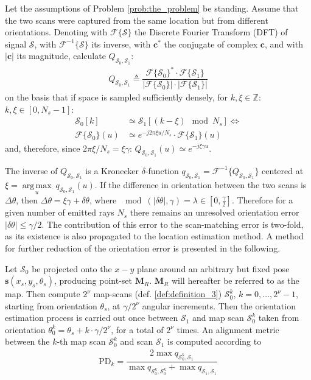 Let the assumptions of Problem \ref{prob:the_problem} be standing. Assume that
the two scans were captured from the same location but from different
orientations. Denoting with $\mathcal{F}\{\mathcal{S}\}$ the Discrete Fourier
Transform (DFT) of signal $\mathcal{S}$, with $\mathcal{F}^{-1}\{\mathcal{S}\}$
its inverse, with $\bm{c}^\ast$ the conjugate of complex $\bm{c}$, and with
$|\bm{c}|$ its magnitude, calculate
$Q_{\mathcal{S}_0, \mathcal{S}_1}$:
\begin{align}
  Q_{\mathcal{S}_0, \mathcal{S}_1} \triangleq \dfrac{\mathcal{F}\{\mathcal{S}_0\}^{\ast} \cdot \mathcal{F}\{\mathcal{S}_1\}}{|\mathcal{F}\{\mathcal{S}_0\}| \cdot |\mathcal{F}\{\mathcal{S}_1\}|}
  \label{eq:Q}
\end{align}
on the basis that if space is sampled sufficiently densely, for
$k,\xi \in \mathbb{Z}$: $k,\xi \in [0, N_s-1]$:
\begin{align}
  \mathcal{S}_0[k] &\simeq \mathcal{S}_1[(k - \xi) \mod N_s] \Leftrightarrow \nonumber \\
  \mathcal{F}\{\mathcal{S}_0\}(u) &\simeq e^{-j 2\pi \xi u / N_s} \cdot \mathcal{F}\{\mathcal{S}_1\}(u) \nonumber
\end{align}
and, therefore, since $2\pi \xi/N_s = \xi \gamma$: $Q_{\mathcal{S}_0, \mathcal{S}_1}(u)  \simeq e^{-j \xi \gamma u}$.

The inverse of $Q_{\mathcal{S}_0, \mathcal{S}_1}$ is a Kronecker
$\delta$-function
$q_{\mathcal{S}_0, \mathcal{S}_1} = \mathcal{F}^{-1}\{Q_{\mathcal{S}_0, \mathcal{S}_1}\}$
centered at $\xi = \operatorname*{arg\,max}\limits_u \ q_{\mathcal{S}_0, \mathcal{S}_1}(u)$.
If the difference in orientation between the two scans is $\Delta\theta$, then
$\Delta\theta = \xi\gamma + \delta\theta$, where
$\mod(|\delta\theta|, \gamma) = \lambda \in [0,\frac{\gamma}{2}]$. Therefore for
a given number of emitted rays $N_s$ there remains an unresolved orientation
error $|\delta\theta| \leq \gamma/2$. The contribution of this error to the
scan-matching error is two-fold, as its existence is also propagated to the
location estimation method. A method for further reduction of
the orientation error is presented in the following.

Let $\mathcal{S}_0$ be projected onto the $x-y$ plane around an arbitrary but
fixed pose $\bm{s}(x_s, y_s, \theta_s)$, producing point-set $\bm{M}_R$.
$\bm{M}_R$ will hereafter be referred to as the map. Then compute $2^\nu$
map-scans (def. \ref{def:definition_3}) $\mathcal{S}_0^k$,
$k = 0,\dots,2^\nu-1$, starting from orientation $\theta_s$, at $\gamma / 2^\nu$
angular increments. Then the orientation estimation process is carried out once
between $\mathcal{S}_1$ and map scan $\mathcal{S}_0^k$ taken from orientation
$\theta_0^k = \theta_s + k \cdot \gamma / 2^\nu$, for a total of $2^\nu$ times.
An alignment metric between the $k$-th map scan $\mathcal{S}_0^k$ and scan
$\mathcal{S}_1$ is computed according to
\begin{align}
  \text{PD}_k = \dfrac{2 \max q_{\mathcal{S}_0^k,\mathcal{S}_1}}{\max q_{\mathcal{S}_0^k,\mathcal{S}_0^k} + \max q_{\mathcal{S}_1,\mathcal{S}_1}}
  \label{eq:pd}
\end{align}

